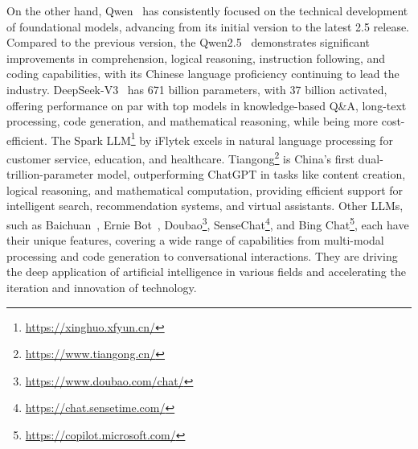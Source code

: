 On the other hand, Qwen~\cite{bai2023qwen} has consistently focused on the technical development of foundational models, advancing from its initial version to the latest 2.5 release. Compared to the previous version, the Qwen2.5~\cite{yang2024qwen2.5} demonstrates significant improvements in comprehension, logical reasoning, instruction following, and coding capabilities, with its Chinese language proficiency continuing to lead the industry. DeepSeek-V3~\cite{deepseekai2024deepseekv3} has 671 billion parameters, with 37 billion activated, offering performance on par with top models in knowledge-based Q\&A, long-text processing, code generation, and mathematical reasoning, while being more cost-efficient. The Spark LLM\footnote{\url{https://xinghuo.xfyun.cn/}} by iFlytek excels in natural language processing for customer service, education, and healthcare. Tiangong\footnote{\url{https://www.tiangong.cn/}} is China's first dual-trillion-parameter model, outperforming ChatGPT in tasks like content creation, logical reasoning, and mathematical computation, providing efficient support for intelligent search, recommendation systems, and virtual assistants. Other LLMs, such as Baichuan~\cite{yang2023baichuan2}, Ernie Bot~\cite{sun2019erniebot}, Doubao\footnote{\url{https://www.doubao.com/chat/}}, SenseChat\footnote{\url{https://chat.sensetime.com/}}, and Bing Chat\footnote{\url{https://copilot.microsoft.com/}}, each have their unique features, covering a wide range of capabilities from multi-modal processing and code generation to conversational interactions. They are driving the deep application of artificial intelligence in various fields and accelerating the iteration and innovation of technology.




